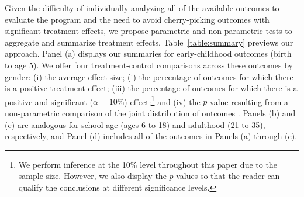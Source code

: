 Given the difficulty of individually analyzing all of the available outcomes to evaluate the program and the need to avoid cherry-picking outcomes with significant treatment effects, we propose parametric and non-parametric tests to aggregate and summarize treatment effects. Table~\ref{table:summary} previews our approach. Panel (a) displays our summaries for early-childhood outcomes (birth to age 5). We offer four treatment-control comparisons across these outcomes by gender: (i) the average effect size; (i) the percentage of outcomes for which there is a positive treatment effect; (iii) the percentage of outcomes for which there is a positive and significant ($\alpha=10\%$) effect;\footnote{We perform inference at the 10\% level throughout this paper due to the sample size. However, we also display the $p$-values so that the reader can qualify the conclusions at different significance levels.} and (iv) the $p$-value resulting from a non-parametric comparison of the joint distribution of outcomes \citep{Rosenbaum_2005_Distribution_JRSS}. Panels (b) and (c) are analogous for school age (ages 6 to 18) and adulthood (21 to 35), respectively, and Panel (d) includes all of the outcomes in Panels (a) through (c).


